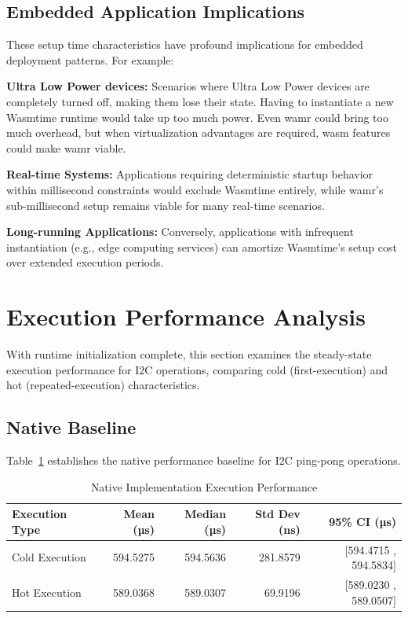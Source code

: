 \subsection{Embedded Application Implications}
\label{subsec:setup-implications}

These setup time characteristics have profound implications for embedded deployment patterns. For example:

\textbf{Ultra Low Power devices:} Scenarios where Ultra Low Power devices are completely turned off, making them lose their state. Having to instantiate a new Wasmtime runtime would take up too much power. Even \acrshort{wamr} could bring too much overhead, but when virtualization advantages are required, \acrshort{wasm} features could make \acrshort{wamr} viable.

\textbf{Real-time Systems:} Applications requiring deterministic startup behavior within millisecond constraints would exclude Wasmtime entirely, while \acrshort{wamr}'s sub-millisecond setup remains viable for many real-time scenarios.

\textbf{Long-running Applications:} Conversely, applications with infrequent instantiation (e.g., edge computing services) can amortize Wasmtime's setup cost over extended execution periods.

\section{Execution Performance Analysis}
\label{sec:eval-execution}

With runtime initialization complete, this section examines the steady-state execution performance for I2C operations, comparing cold (first-execution) and hot (repeated-execution) characteristics.

\subsection{Native Baseline}
\label{subsec:eval-execution-native}

Table~\ref{tab:native-execution} establishes the native performance baseline for I2C ping-pong operations.

\begin{table}[htbp]
    \centering
    \caption{Native Implementation Execution Performance}
    \label{tab:native-execution}
    \begin{tabular}{lrrrr}
        \toprule
        \textbf{Execution Type} & \textbf{Mean (µs)} & \textbf{Median (µs)} & \textbf{Std Dev (ns)} & \textbf{95\% CI (µs)} \\
        \midrule
        Cold Execution  & 594.5275 & 594.5636 & 281.8579 & [594.4715 , 594.5834] \\
        Hot Execution   & 589.0368 & 589.0307 & 69.9196 & [589.0230 , 589.0507] \\
    \end{tabular}
\end{table}

